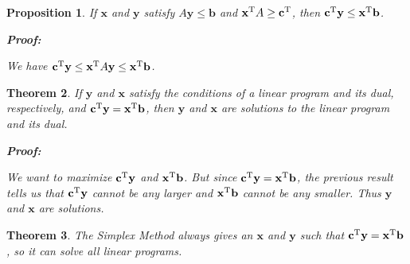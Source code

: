 \documentclass{article}
\theoremstyle{colontheorem}
\newtheorem{theorem}{Theorem}[section]
\newtheorem{proposition}[theorem]{Proposition}
\newcommand{\T}{^\textnormal{T}}
\newenvironment{Theorem}
{
	\begin{mdframed}[backgroundcolor=TheoremOrange!10]
	\begin{theorem}
}
{
	\end{theorem}
	\end{mdframed}
	
	\vspace{.15in}
}
\newenvironment{Proposition}
{
	\begin{mdframed}[backgroundcolor=TheoremOrange!10]
	\begin{proposition}
}
{
	\end{proposition}
	\end{mdframed}
	
	\vspace{.15in}
}
\newenvironment{Proof}
{
	\begin{mdframed}[backgroundcolor=ProofPurple!10]
	\textbf{Proof:}%
}
{
	\end{mdframed}
	
	\vspace{.085in}
}
\begin{document}
\begin{Proposition}
	
	If $\mathbf{x}$ and $\mathbf{y}$ satisfy $A\mathbf{y} \leq \mathbf{b}$ and $\mathbf{x}\T A \geq \mathbf{c}\T$, then $\mathbf{c}\T \mathbf{y} \leq \mathbf{x}\T \mathbf{b}$.
	
	\begin{Proof}
		We have $\mathbf{c}\T \mathbf{y} \leq \mathbf{x}\T A \mathbf{y} \leq \mathbf{x}\T \mathbf{b}$.
		
	\end{Proof}
	
\end{Proposition}



\begin{Theorem}
	
	If $\mathbf{y}$ and $\mathbf{x}$ satisfy the conditions of a linear program and its dual, respectively, and $\mathbf{c}\T \mathbf{y} = \mathbf{x}\T \mathbf{b}$, then $\mathbf{y}$ and $\mathbf{x}$ are solutions to the linear program and its dual.
	
	\begin{Proof}
		We want to maximize $\mathbf{c}\T \mathbf{y}$ and $\mathbf{x}\T \mathbf{b}$. But since $\mathbf{c}\T \mathbf{y} = \mathbf{x}\T \textbf{b}$, the previous result tells us that $\mathbf{c}\T \mathbf{y}$ cannot be any larger and $\mathbf{x}\T \mathbf{b}$ cannot be any smaller. Thus $\mathbf{y}$ and $\mathbf{x}$ are solutions.
		
	\end{Proof}
	
\end{Theorem}



\begin{Theorem}
	
	The Simplex Method always gives an $\mathbf{x}$ and $\mathbf{y}$ such that $\mathbf{c}\T \mathbf{y} = \mathbf{x}\T \textbf{b}$, so it can solve all linear programs.
	
\end{Theorem}
\end{document}
